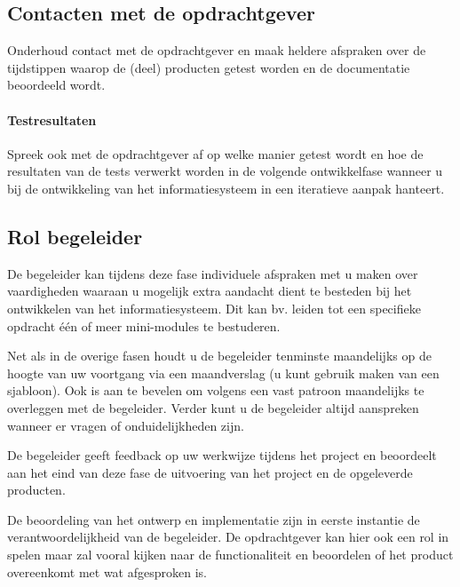 \subsection{Contacten met de opdrachtgever}
    Onderhoud contact met de opdrachtgever en maak heldere afspraken over de
tijdstippen waarop de (deel) producten getest worden en de documentatie
beoordeeld wordt.
\paragraph{Testresultaten}
Spreek ook met de opdrachtgever af op welke manier getest wordt en hoe
de resultaten van de tests verwerkt worden in de volgende ontwikkelfase
wanneer u bij de ontwikkeling van het informatiesysteem in een iteratieve
aanpak hanteert.
\subsection{Rol begeleider}
De begeleider kan tijdens deze fase individuele afspraken met u maken over
vaardigheden waaraan u mogelijk extra aandacht dient te besteden bij het
ontwikkelen van het informatiesysteem. Dit kan bv. leiden tot een specifieke
opdracht één of meer mini-modules te bestuderen.

Net als in de overige fasen houdt u de begeleider tenminste maandelijks op
de hoogte van uw voortgang via een maandverslag (u kunt gebruik maken van een
sjabloon). Ook is aan te bevelen om volgens een vast patroon maandelijks te
overleggen met de begeleider. Verder kunt u de begeleider altijd aanspreken
wanneer er vragen of onduidelijkheden zijn.

De begeleider  geeft feedback op uw werkwijze tijdens het project en
beoordeelt aan het eind van deze fase de uitvoering van het project en de
opgeleverde producten.

De beoordeling van het ontwerp en implementatie zijn in eerste instantie de
verantwoordelijkheid van de begeleider. De opdrachtgever kan hier ook een rol in
spelen maar zal vooral kijken naar de functionaliteit en beoordelen of het
product overeenkomt met wat afgesproken is.

